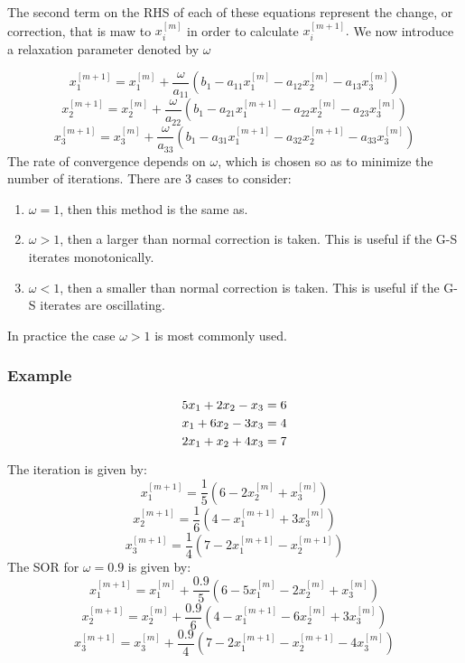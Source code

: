 The second term on the RHS of each of these equations represent the change, or correction, that is maw to $x^{[m]}_i$ in order to calculate $x^{[m+1]}_i.$
We now introduce a relaxation parameter denoted by $\omega$

\begin{equation*}
x_{1}^{[m+1]} =x_1^{[m]}+ \frac{\omega}{a_{11}}(b_1-a_{11}x_{1}^{[m]}-a_{12}x_2^{[m]} - a_{13}x^{[m]}_{3}) 
\end{equation*}
\begin{equation*}
x_{2}^{[m+1]} =x_2^{[m]}+ \frac{\omega}{a_{22}}(b_1-a_{21}x_1^{[m+1]}-a_{22}x_{2}^{[m]} - a_{23}x^{[m]}_{3}) 
\end{equation*}
\begin{equation*}
x_{3}^{[m+1]} =x_3^{[m]}+ \frac{\omega}{a_{33}}(b_1-a_{31}x_1^{[m+1]} - a_{32}x^{[m+1]}_{2}-a_{33}x_{3}^{[m]})
\end{equation*}
The rate of convergence depends on $\omega$, which is chosen so as to minimize the
number of iterations. There are 3 cases to consider:
\begin{enumerate}
\item
$\omega =1$, then this method is the same as.
\item
$\omega > 1$, then a larger than normal correction is taken.  This is useful if the G-S iterates monotonically.
\item
$\omega < 1$, then a smaller than normal correction is taken.  This is useful if the G-S iterates are oscillating.
\end{enumerate}
In practice the case $\omega > 1$ is most commonly used.
\subsubsection*{Example}
\begin{equation*}
5x_1 + 2x_2 - x_3 = 6\\
\end{equation*}
\begin{equation*}
x_1 + 6x_2 - 3x_3 = 4\\
\end{equation*}
\begin{equation*}
2x_1 + x_2 + 4x_3 = 7\\
\end{equation*}

The iteration is given by:
\[ x^{[m+1]}_1 = \frac{1}{5}(6-2x_2^{[m]} + x^{[m]}_3)\]
\[ x^{[m+1]}_2 = \frac{1}{6}(4-x_1^{[m+1]} + 3x^{[m]}_3) \]
\[ x^{[m+1]}_3 = \frac{1}{4}(7-2x_1^{[m+1]} - x^{[m+1]}_2) \]
The SOR for $\omega =0.9$ is given by:
\[ x^{[m+1]}_1 = x^{[m]}_1+\frac{0.9}{5}(6-5x_1^{[m]}-2x_2^{[m]} + x^{[m]}_3)\]
\[ x^{[m+1]}_2 = x^{[m]}_2+\frac{0.9}{6}(4-x_1^{[m+1]} -6x_2^{[m]}+ 3x^{[m]}_3) \]
\[ x^{[m+1]}_3 = x^{[m]}_3+\frac{0.9}{4}(7-2x_1^{[m+1]} - x^{[m+1]}_2-4x_3^{[m]}) \]
